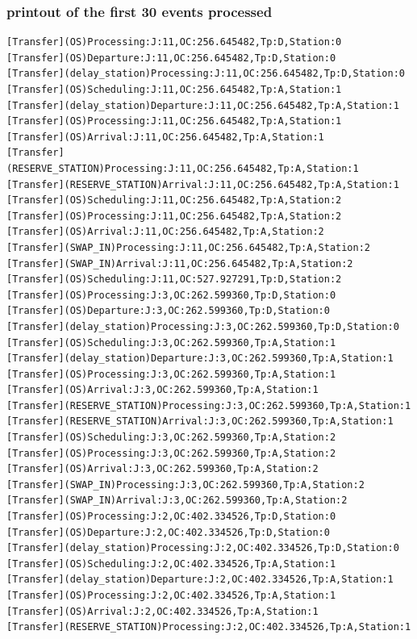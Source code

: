 \documentclass[12pt,a4paper]{article}
\begin{document}
\pagebreak
\subsubsection{printout of the first 30 events processed}

\begin{lstlisting}
[Transfer](OS)Processing:J:11,OC:256.645482,Tp:D,Station:0
[Transfer](OS)Departure:J:11,OC:256.645482,Tp:D,Station:0
[Transfer](delay_station)Processing:J:11,OC:256.645482,Tp:D,Station:0
[Transfer](OS)Scheduling:J:11,OC:256.645482,Tp:A,Station:1
[Transfer](delay_station)Departure:J:11,OC:256.645482,Tp:A,Station:1
[Transfer](OS)Processing:J:11,OC:256.645482,Tp:A,Station:1
[Transfer](OS)Arrival:J:11,OC:256.645482,Tp:A,Station:1
[Transfer](RESERVE_STATION)Processing:J:11,OC:256.645482,Tp:A,Station:1
[Transfer](RESERVE_STATION)Arrival:J:11,OC:256.645482,Tp:A,Station:1
[Transfer](OS)Scheduling:J:11,OC:256.645482,Tp:A,Station:2
[Transfer](OS)Processing:J:11,OC:256.645482,Tp:A,Station:2
[Transfer](OS)Arrival:J:11,OC:256.645482,Tp:A,Station:2
[Transfer](SWAP_IN)Processing:J:11,OC:256.645482,Tp:A,Station:2
[Transfer](SWAP_IN)Arrival:J:11,OC:256.645482,Tp:A,Station:2
[Transfer](OS)Scheduling:J:11,OC:527.927291,Tp:D,Station:2
[Transfer](OS)Processing:J:3,OC:262.599360,Tp:D,Station:0
[Transfer](OS)Departure:J:3,OC:262.599360,Tp:D,Station:0
[Transfer](delay_station)Processing:J:3,OC:262.599360,Tp:D,Station:0
[Transfer](OS)Scheduling:J:3,OC:262.599360,Tp:A,Station:1
[Transfer](delay_station)Departure:J:3,OC:262.599360,Tp:A,Station:1
[Transfer](OS)Processing:J:3,OC:262.599360,Tp:A,Station:1
[Transfer](OS)Arrival:J:3,OC:262.599360,Tp:A,Station:1
[Transfer](RESERVE_STATION)Processing:J:3,OC:262.599360,Tp:A,Station:1
[Transfer](RESERVE_STATION)Arrival:J:3,OC:262.599360,Tp:A,Station:1
[Transfer](OS)Scheduling:J:3,OC:262.599360,Tp:A,Station:2
[Transfer](OS)Processing:J:3,OC:262.599360,Tp:A,Station:2
[Transfer](OS)Arrival:J:3,OC:262.599360,Tp:A,Station:2
[Transfer](SWAP_IN)Processing:J:3,OC:262.599360,Tp:A,Station:2
[Transfer](SWAP_IN)Arrival:J:3,OC:262.599360,Tp:A,Station:2
[Transfer](OS)Processing:J:2,OC:402.334526,Tp:D,Station:0
[Transfer](OS)Departure:J:2,OC:402.334526,Tp:D,Station:0
[Transfer](delay_station)Processing:J:2,OC:402.334526,Tp:D,Station:0
[Transfer](OS)Scheduling:J:2,OC:402.334526,Tp:A,Station:1
[Transfer](delay_station)Departure:J:2,OC:402.334526,Tp:A,Station:1
[Transfer](OS)Processing:J:2,OC:402.334526,Tp:A,Station:1
[Transfer](OS)Arrival:J:2,OC:402.334526,Tp:A,Station:1
[Transfer](RESERVE_STATION)Processing:J:2,OC:402.334526,Tp:A,Station:1

\end{lstlisting}
\end{document}
